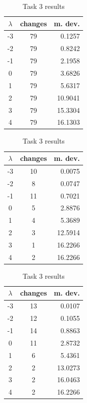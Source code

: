 \documentclass[12pt]{article}
\begin{document}
\begin{table}[!htb]
    \begin{minipage}{.33\linewidth}
        \centering
        \caption{Task 1 results}
        \begin{tabular}{c|cr}
            $\lambda$ & changes & m. dev. \\
            \hline
            -3 & 79 & 0.1257 \\
            -2 & 79 & 0.8242 \\
            -1 & 79 & 2.1958 \\
            0 & 79 & 3.6826 \\
            1 & 79 & 5.6317 \\
            2 & 79 & 10.9041 \\
            3 & 79 & 15.3304 \\
            4 & 79 & 16.1303
        \end{tabular}
    \end{minipage}%
    \begin{minipage}{.33\linewidth}
      \centering
        \caption{Task 2 results}
        \begin{tabular}{c|cr}
            $\lambda$ & changes & m. dev. \\
            \hline
            -3 & 10 & 0.0075 \\
            -2 & 8 & 0.0747 \\
            -1 & 11 & 0.7021 \\
            0 & 5 & 2.8876 \\
            1 & 4 & 5.3689 \\
            2 & 3 & 12.5914 \\
            3 & 1 & 16.2266 \\
            4 & 2 & 16.2266
        \end{tabular}
    \end{minipage}%
    \begin{minipage}{.33\linewidth}
      \centering
        \caption{Task 3 results}
        \begin{tabular}{c|cr}
            $\lambda$ & changes & m. dev. \\
            \hline
            -3 & 13 & 0.0107 \\
            -2 & 12 & 0.1055 \\
            -1 & 14 & 0.8863 \\
            0 & 11 & 2.8732 \\
            1 & 6 & 5.4361 \\
            2 & 2 & 13.0273 \\
            3 & 2 & 16.0463 \\
            4 & 2 & 16.2266
        \end{tabular}
    \end{minipage} 
\end{table}
\end{document}
